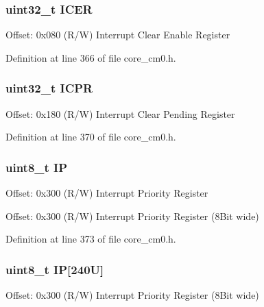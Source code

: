 \subsubsection[{\texorpdfstring{I\+C\+ER}{ICER}}]{ uint32\+\_\+t I\+C\+ER}\hypertarget{struct_n_v_i_c___type_a3617ee583e4154c0a5901c6965020da9}{}\label{struct_n_v_i_c___type_a3617ee583e4154c0a5901c6965020da9}
Offset\+: 0x080 (R/W) Interrupt Clear Enable Register 

Definition at line 366 of file core\+\_\+cm0.\+h.

\subsubsection[{\texorpdfstring{I\+C\+PR}{ICPR}}]{ uint32\+\_\+t I\+C\+PR}\hypertarget{struct_n_v_i_c___type_a4d45961e44d2663447bbf0111755c0e7}{}\label{struct_n_v_i_c___type_a4d45961e44d2663447bbf0111755c0e7}
Offset\+: 0x180 (R/W) Interrupt Clear Pending Register 

Definition at line 370 of file core\+\_\+cm0.\+h.

\subsubsection[{\texorpdfstring{IP}{IP}}]{ uint8\+\_\+t IP}\hypertarget{struct_n_v_i_c___type_a1787506107747d2dedae05295d3532da}{}\label{struct_n_v_i_c___type_a1787506107747d2dedae05295d3532da}
Offset\+: 0x300 (R/W) Interrupt Priority Register

Offset\+: 0x300 (R/W) Interrupt Priority Register (8\+Bit wide) 

Definition at line 373 of file core\+\_\+cm0.\+h.

\subsubsection[{\texorpdfstring{IP}{IP}}]{ uint8\+\_\+t IP\mbox{[}240\+U\mbox{]}}\hypertarget{struct_n_v_i_c___type_a4fda947a8fd3237a89d43b7d5a1057cb}{}\label{struct_n_v_i_c___type_a4fda947a8fd3237a89d43b7d5a1057cb}
Offset\+: 0x300 (R/W) Interrupt Priority Register (8\+Bit wide) 

